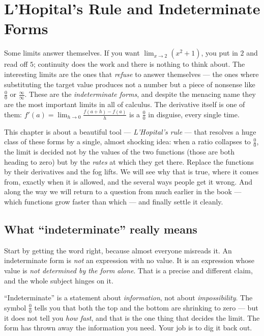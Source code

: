 \chapter{L'Hopital's Rule and Indeterminate Forms}

Some limits answer themselves. If you want $\lim_{x\to 2}(x^2+1)$, you put in $2$ and
read off $5$; continuity does the work and there is nothing to think about. The
interesting limits are the ones that \emph{refuse} to answer themselves --- the ones
where substituting the target value produces not a number but a piece of nonsense
like $\tfrac{0}{0}$ or $\tfrac{\infty}{\infty}$. These are the \emph{indeterminate
forms}, and despite the menacing name they are the most important limits in all of
calculus. The derivative itself is one of them: $f'(a)=\lim_{h\to 0}\frac{f(a+h)-f(a)}{h}$
is a $\tfrac{0}{0}$ in disguise, every single time.

This chapter is about a beautiful tool --- \emph{L'Hopital's rule} --- that resolves
a huge class of these forms by a single, almost shocking idea: when a ratio collapses
to $\tfrac{0}{0}$, the limit is decided not by the values of the two functions (those
are both heading to zero) but by the \emph{rates} at which they get there. Replace the
functions by their derivatives and the fog lifts. We will see why that is true, where
it comes from, exactly when it is allowed, and the several ways people get it wrong.
And along the way we will return to a question from much earlier in the book --- which
functions grow faster than which --- and finally settle it cleanly.

\section{What ``indeterminate'' really means}

Start by getting the word right, because almost everyone misreads it. An
indeterminate form is \emph{not} an expression with no value. It is an expression
whose value is \emph{not determined by the form alone}. That is a precise and
different claim, and the whole subject hinges on it.

\begin{focusbox}
``Indeterminate'' is a statement about \emph{information}, not about
\emph{impossibility}. The symbol $\tfrac{0}{0}$ tells you that both the top and the
bottom are shrinking to zero --- but it does not tell you \emph{how fast}, and that is
the one thing that decides the limit. The form has thrown away the information you
need. Your job is to dig it back out.
\end{focusbox}

